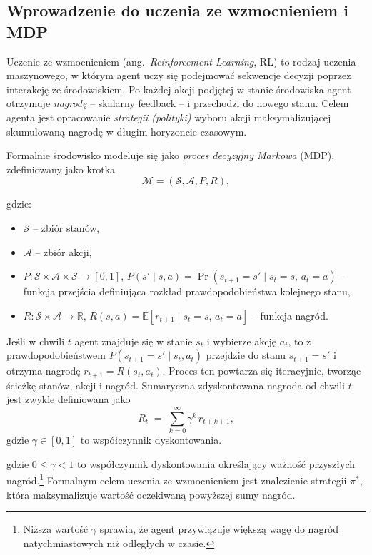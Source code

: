 \documentclass[a4paper,12pt]{article}
\begin{document}
\clearpage 

\subsection{Wprowadzenie do uczenia ze wzmocnieniem i MDP}
Uczenie ze wzmocnieniem (ang.\ \emph{Reinforcement Learning}, RL) to rodzaj uczenia maszynowego, w którym agent uczy się podejmować sekwencje decyzji poprzez interakcję ze środowiskiem. Po każdej akcji podjętej w stanie środowiska agent otrzymuje \emph{nagrodę} – skalarny feedback – i przechodzi do nowego stanu. Celem agenta jest opracowanie \emph{strategii (polityki)} wyboru akcji maksymalizującej skumulowaną nagrodę w długim horyzoncie czasowym.

Formalnie środowisko modeluje się jako \emph{proces decyzyjny Markowa} (MDP), zdefiniowany jako krotka
\begin{equation}
\mathcal{M} = (\mathcal{S}, \mathcal{A}, P, R),
\end{equation}

gdzie:
\begin{itemize}
  \item $\mathcal{S}$ – zbiór stanów,
  \item $\mathcal{A}$ – zbiór akcji,
  \item $P: \mathcal{S}\times\mathcal{A}\times\mathcal{S}\to[0,1]$, \quad
        $P(s' \mid s,a)=\Pr(s_{t+1}=s'\mid s_t=s,\,a_t=a)$ – funkcja przejścia definiująca rozkład prawdopodobieństwa kolejnego stanu,
  \item $R: \mathcal{S}\times\mathcal{A}\to\mathbb{R}$, \quad
        $R(s,a)=\mathbb{E}[r_{t+1}\mid s_t=s,\,a_t=a]$ – funkcja nagród.
\end{itemize}

Jeśli w chwili $t$ agent znajduje się w stanie $s_t$ i wybierze akcję $a_t$, to z prawdopodobieństwem 
$P(s_{t+1}=s'\mid s_t,a_t)$ przejdzie do stanu $s_{t+1}=s'$ i otrzyma nagrodę 
$r_{t+1}=R(s_t,a_t)$. Proces ten powtarza się iteracyjnie, tworząc ścieżkę stanów, akcji i nagród. 
Sumaryczna zdyskontowana nagroda od chwili $t$ jest zwykle definiowana jako
\begin{equation}
R_t \;=\; \sum_{k=0}^{\infty} \gamma^k\,r_{t+k+1},
\end{equation}
gdzie $\gamma\in[0,1]$ to współczynnik dyskontowania.

gdzie \(0 \le \gamma < 1\) to współczynnik dyskontowania określający ważność przyszłych nagród.\footnote{Niższa wartość \(\gamma\) sprawia, że agent przywiązuje większą wagę do nagród natychmiastowych niż odległych w czasie.} Formalnym celem uczenia ze wzmocnieniem jest znalezienie strategii \(\pi^*\), która maksymalizuje wartość oczekiwaną powyższej sumy nagród.
\end{document}

